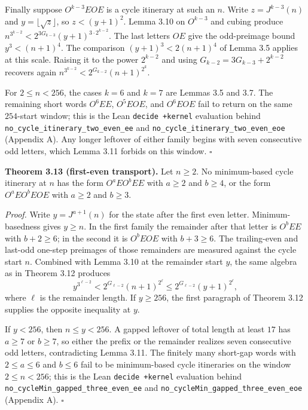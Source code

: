 \documentclass[12pt]{article}
\begin{document}
Finally suppose \(O^{k-3}EOE\) is a cycle itinerary at such an \(n\).
Write \(z=J^{k-3}(n)\) and \(y=\lfloor\sqrt z\rfloor\), so
\(z<(y+1)^2\). Lemma 3.10 on \(O^{k-3}\) and cubing produce
\(n^{3^{k-2}}<2^{3G_{k-3}}(y+1)^{3\cdot 2^{k-2}}\). The last letters
\(OE\) give the odd-preimage bound \(y^3<(n+1)^4\). The comparison
\((y+1)^3<2(n+1)^4\) of Lemma 3.5 applies at this scale. Raising it to
the power \(2^{k-2}\) and using \(G_{k-2}=3G_{k-3}+2^{k-2}\) recovers
again \(n^{3^{k-2}}<2^{G_{k-2}}(n+1)^{2^k}\).

For \(2\le n<256\), the cases \(k=6\) and \(k=7\) are Lemmas 3.5 and
3.7. The remaining short words \(O^6EE\), \(O^5EOE\), and \(O^6EOE\)
fail to return on the same \(254\)-start window; this is the Lean
\texttt{decide\ +kernel} evaluation behind
\texttt{\nolinkurl{no_cycle_itinerary_two_even_ee}} and
\texttt{\nolinkurl{no_cycle_itinerary_two_even_eoe}} (Appendix A). Any
longer leftover of either family begins with seven consecutive odd
letters, which Lemma 3.11 forbids on this window. \(\square\)

\textbf{Theorem 3.13 (first-even transport).} Let \(n\ge 2\). No
minimum-based cycle itinerary at \(n\) has the form \(O^aEO^bEE\) with
\(a\ge 2\) and \(b\ge 4\), or the form \(O^aEO^bEOE\) with \(a\ge 2\)
and \(b\ge 3\).

\emph{Proof.} Write \(y=J^{a+1}(n)\) for the state after the first even
letter. Minimum-basedness gives \(y\ge n\). In the first family the
remainder after that letter is \(O^bEE\) with \(b+2\ge 6\); in the
second it is \(O^bEOE\) with \(b+3\ge 6\). The trailing-even and
last-odd one-step preimages of those remainders are measured against the
cycle start \(n\). Combined with Lemma 3.10 at the remainder start
\(y\), the same algebra as in Theorem 3.12 produces \[
y^{3^{\ell-2}}
<
2^{G_{\ell-2}}(n+1)^{2^\ell}
\le
2^{G_{\ell-2}}(y+1)^{2^\ell},
\] where \(\ell\) is the remainder length. If \(y\ge 256\), the first
paragraph of Theorem 3.12 supplies the opposite inequality at \(y\).

If \(y<256\), then \(n\le y<256\). A gapped leftover of total length at
least \(17\) has \(a\ge 7\) or \(b\ge 7\), so either the prefix or the
remainder realizes seven consecutive odd letters, contradicting Lemma
3.11. The finitely many short-gap words with \(2\le a\le 6\) and
\(b\le 6\) fail to be minimum-based cycle itineraries on the window
\(2\le n<256\); this is the Lean \texttt{decide\ +kernel} evaluation
behind \texttt{\nolinkurl{no_cycleMin_gapped_three_even_ee}} and
\texttt{\nolinkurl{no_cycleMin_gapped_three_even_eoe}} (Appendix A).
\(\square\)
\end{document}
